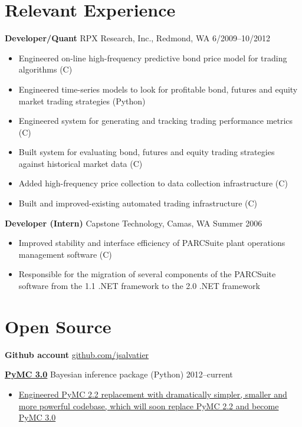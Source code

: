 \documentclass[margin]{res}
\newcommand{\bitem}{\begin{samepage}\begin{itemize} \itemsep -2pt}
\newcommand{\eitem}{\end{itemize}\end{samepage} }
\newcommand{\hrowbase}[3]{
  {\bf #1} #2 \hfill #3
}
\newcommand{\headrow}[3]{
  \hrowbase{#1}{#2}{#3}
    \vspace{6pt}
    \bitem
      }
\newcommand{\eheadrow}[0]{\eitem}
\newcommand{\CS}
{C\nolinebreak[4]\hspace{-.05em}\raisebox{.22ex}{\footnotesize\#}}
\begin{document}
 

\resumewidth=6.5in
\newsectionwidth{1.0in}
\begin{resume} 
 

\section{Relevant Experience}
  \headrow{Developer/Quant}{RPX Research, Inc., Redmond, WA}{6/2009--10/2012}
     \item Engineered on-line high-frequency predictive bond price model for trading algorithms (\CS)
     \item Engineered time-series models to look for profitable bond, futures and equity market trading strategies (Python) 
     \item Engineered system for generating and tracking trading performance metrics (\CS)
     \item Built system for evaluating bond, futures and equity trading strategies against historical market data (\CS) 
     \item Added high-frequency price collection to data collection infrastructure (\CS)
     \item Built and improved-existing automated trading infrastructure (\CS)
  \eheadrow

  \headrow{Developer (Intern)}{Capstone Technology, Camas, WA}{Summer 2006}
    \item Improved stability and interface efficiency of PARCSuite plant operations management software (\CS)
    \item Responsible for the migration of several components of the PARCSuite software from the 1.1 .NET framework to the 2.0 .NET framework 
  \eheadrow

 \section{Open Source}
 {\bf Github account} \href{https://github.com/jsalvatier}{github.com/jsalvatier}

    \headrow{\href{https://github.com/pymc-devs/pymc/commits/pymc3\#readme}{PyMC 3.0}}{Bayesian inference package (Python)}{2012--current}
      \item \href{https://github.com/pymc-devs/pymc/commits/pymc3}{Engineered PyMC 2.2 replacement with dramatically simpler, smaller and more powerful codebase, which will soon replace PyMC 2.2 and become PyMC 3.0}
    \eheadrow


\end{resume}
\end{document}
